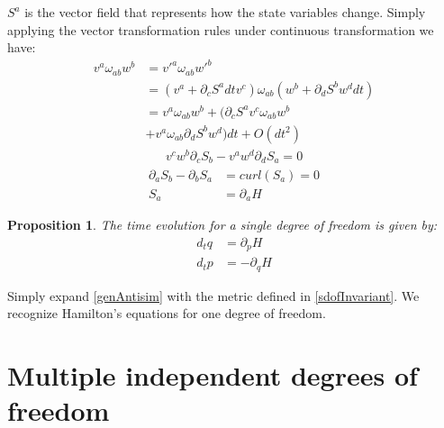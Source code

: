 \documentclass[aps,pra,10pt,twocolumn,floatfix,nofootinbib]{revtex4-1}
\newtheorem{prop}[thm]{Proposition}
\theoremstyle{definition}
\begin{document}
$S^{a}$ is the vector field that represents how the state variables change. Simply applying the vector transformation rules under continuous transformation we have:
\begin{align*}
v^{a} \omega_{ab} w^{b} &= v'^{a} \omega_{ab} w'^{b}  \\
&= (v^{a} + \partial_{c} S^{a} dt v^{c}) \omega_{ab} ( w^{b} + \partial_{d} S^{b} w^{d} dt) \\
&= v^{a} \omega_{ab} w^{b} + (\partial_{c} S^{a} v^{c} \omega_{ab} w^{b} \\
 &+ v^{a} \omega_{ab} \partial_{d} S^{b} w^{d}) dt + O(dt^2)
\end{align*}
\begin{align*}
v^{c} w^{b} \partial_{c} S_{b} - v^{a} w^{d} \partial_{d} S_{a} = 0
\end{align*}
\begin{align*}
\partial_{a} S_{b} - \partial_{b} S_{a} &= curl(S_{a}) = 0 \\
S_{a} &= \partial_{a}H
\end{align*}

\begin{prop}\label{sdofHam}
The time evolution for a single degree of freedom is given by:
\begin{align*}
d_{t}q &= \partial_{p} H \\
d_{t}p &= - \partial_{q} H
\end{align*}
\end{prop}

Simply expand \ref{genAntisim} with the metric defined in \ref{sdofInvariant}. We recognize Hamilton's equations for one degree of freedom\cite{classical_dynamics}.

\section{Multiple independent degrees of freedom}
\end{document}
